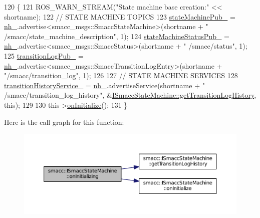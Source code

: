 \begin{DoxyCode}
120 \{
121     ROS\_WARN\_STREAM(\textcolor{stringliteral}{"State machine base creation:"} << shortname);
122     \textcolor{comment}{// STATE MACHINE TOPICS}
123     \hyperlink{classsmacc_1_1ISmaccStateMachine_af4aa9fed70bd4c57b19e3370fbd25de7}{stateMachinePub\_} = \hyperlink{classsmacc_1_1ISmaccStateMachine_ad8877bcca9dbb345fe72cca839c93dd3}{nh\_}.advertise<smacc\_msgs::SmaccStateMachine>(shortname + \textcolor{stringliteral}{"
      /smacc/state\_machine\_description"}, 1);
124     \hyperlink{classsmacc_1_1ISmaccStateMachine_a55a7c7b26ad4dfea441c62c6326a5414}{stateMachineStatusPub\_} = \hyperlink{classsmacc_1_1ISmaccStateMachine_ad8877bcca9dbb345fe72cca839c93dd3}{nh\_}.advertise<smacc\_msgs::SmaccStatus>(shortname + \textcolor{stringliteral}{"
      /smacc/status"}, 1);
125     \hyperlink{classsmacc_1_1ISmaccStateMachine_acc42eb050325c1edc77d81675fb1286a}{transitionLogPub\_} = \hyperlink{classsmacc_1_1ISmaccStateMachine_ad8877bcca9dbb345fe72cca839c93dd3}{nh\_}.advertise<smacc\_msgs::SmaccTransitionLogEntry>(shortname + \textcolor{stringliteral}{
      "/smacc/transition\_log"}, 1);
126 
127     \textcolor{comment}{// STATE MACHINE SERVICES}
128     \hyperlink{classsmacc_1_1ISmaccStateMachine_a73e2a7ca89c3d807eafe5cfb1e86ea05}{transitionHistoryService\_} = \hyperlink{classsmacc_1_1ISmaccStateMachine_ad8877bcca9dbb345fe72cca839c93dd3}{nh\_}.advertiseService(shortname + \textcolor{stringliteral}{"
      /smacc/transition\_log\_history"}, &\hyperlink{classsmacc_1_1ISmaccStateMachine_ae7c08fc2addf8ee4785f721050e6a763}{ISmaccStateMachine::getTransitionLogHistory}, \textcolor{keyword}{
      this});
129 
130     this->\hyperlink{classsmacc_1_1ISmaccStateMachine_ac2982c6c8283663e5e1e8a7c82f511ec}{onInitialize}();
131 \}
\end{DoxyCode}


Here is the call graph for this function\+:
\nopagebreak
\begin{figure}[H]
\begin{center}
\leavevmode
\includegraphics[width=350pt]{classsmacc_1_1ISmaccStateMachine_ae8c9c79ca6cd77c975f5d9cda33a6d5e_cgraph}
\end{center}
\end{figure}




